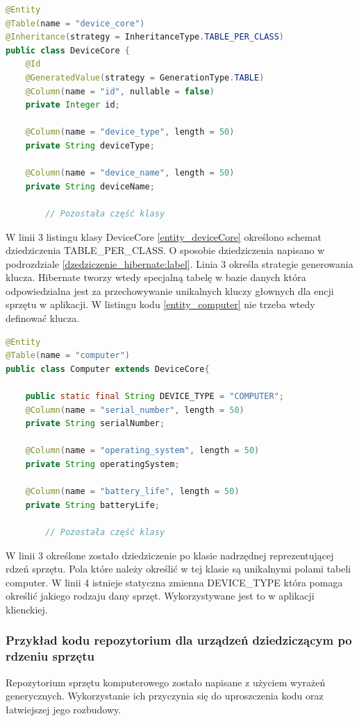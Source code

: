 \begin{lstlisting}[language=Java, style=JavaStyle, caption={Klasa nadrzędna reprezentująca rdzeń sprzętu: DeviceCore}, label={entity_deviceCore}]
@Entity
@Table(name = "device_core")
@Inheritance(strategy = InheritanceType.TABLE_PER_CLASS)
public class DeviceCore {
    @Id
    @GeneratedValue(strategy = GenerationType.TABLE)
    @Column(name = "id", nullable = false)
    private Integer id;

    @Column(name = "device_type", length = 50)
    private String deviceType;

    @Column(name = "device_name", length = 50)
    private String deviceName;
		
		// Pozostała część klasy

\end{lstlisting}
W linii 3 listingu klasy DeviceCore \ref{entity_deviceCore} określono schemat dziedziczenia TABLE\_PER\_CLASS. O sposobie dziedziczenia napisano w podrozdziale \ref{dzedziczenie_hibernate:label}. Linia 3 określa strategie generowania klucza. Hibernate tworzy wtedy specjalną tabelę w bazie danych która odpowiedzialna jest za przechowywanie unikalnych kluczy głownych dla encji sprzętu w aplikacji. W listingu kodu \ref{entity_computer} nie trzeba wtedy definować klucza.

\begin{lstlisting}[language=Java, style=JavaStyle,  caption={Klasa potomna: Computer, reprezentująca komputer}, label={entity_computer}]
@Entity
@Table(name = "computer")
public class Computer extends DeviceCore{

    public static final String DEVICE_TYPE = "COMPUTER";
    @Column(name = "serial_number", length = 50)
    private String serialNumber;

    @Column(name = "operating_system", length = 50)
    private String operatingSystem;

    @Column(name = "battery_life", length = 50)
    private String batteryLife;
		
		// Pozostała część klasy
\end{lstlisting}
W linii 3 określone zostało dziedziczenie po klasie nadrzędnej reprezentującej rdzeń sprzętu. Pola które należy określić w tej klasie są unikalnymi polami tabeli computer. W linii 4 istnieje statyczna zmienna DEVICE\_TYPE która pomaga określić jakiego rodzaju dany sprzęt. Wykorzystywane jest to w aplikacji klienckiej.


\subsubsection{Przykład kodu repozytorium dla urządzeń dziedziczącym po rdzeniu sprzętu}
Repozytorium sprzętu komputerowego zostało napisane z użyciem wyrażeń generycznych. Wykorzystanie ich przyczynia się do uproszczenia kodu oraz łatwiejszej jego rozbudowy.

